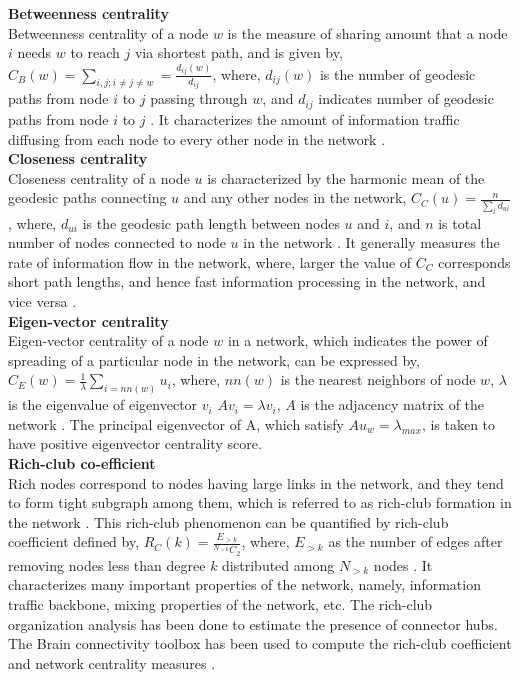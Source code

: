 \documentclass[preprintnumbers,amsmath,amssymb,onecolumn]{revtex4}
\begin{document}
{\noindent}\textbf{Betweenness centrality}\\
Betweenness centrality of a node $w$ is the measure of sharing amount that a node $i$ needs $w$ to reach $j$ via shortest path, and is given by, $C_B(w)=\sum_{i,j;i\ne j\ne w}=\frac{d_{ij}(w)}{d_{ij}}$, where, $d_{ij}(w)$ is the number of geodesic paths from node $i$ to $j$ passing through $w$, and $d_{ij}$ indicates number of geodesic paths from node $i$ to $j$ \citep{Freeman1978}. It characterizes the amount of information traffic diffusing from each node to every other node in the network \citep{borgatti2005}.\\
{\noindent}\textbf{Closeness centrality}\\
Closeness centrality of a node $u$ is characterized by the harmonic mean of the geodesic paths connecting $u$ and any other nodes in the network, $C_C(u)=\frac{n}{\sum_id_{ui}}$, where, $d_{ui}$ is the geodesic path length between nodes $u$ and $i$, and $n$ is total number of nodes connected to node $u$ in the network \citep{Canright2004}. It generally measures the rate of information flow in the network, where, larger the value of $C_C$ corresponds short path lengths, and hence fast information processing in the network, and vice versa \citep{borgatti2005}.\\
{\noindent}\textbf{Eigen-vector centrality}\\
Eigen-vector centrality of a node $w$ in a network, which indicates the power of spreading of a particular node in the network, can be expressed by, $C_E(w)=\frac{1}{\lambda}\sum_{i=nn(w)}u_i$, where, $nn(w)$ is the nearest neighbors of node $w$, $\lambda$ is the eigenvalue of eigenvector $v_i$ $Av_i=\lambda v_i$, $A$ is the adjacency matrix of the network \citep{Canright2004}. The principal eigenvector of A, which satisfy $Au_w=\lambda_{max}$, is taken to have positive eigenvector centrality score.\\
{\noindent}\textbf{Rich-club co-efficient}\\
Rich nodes correspond to nodes having large links in the network, and they tend to form tight subgraph among them, which is referred to as rich-club formation in the network \citep{zhou2004}. This rich-club phenomenon can be quantified by rich-club coefficient defined by, $R_C(k)=\frac{E_{>k}}{^{N_{>k}}C_2}$, where, $E_{>k}$ as the number of edges after removing nodes less than degree $k$ distributed among $N_{>k}$ nodes \citep{Colizza2006}. It characterizes many important properties of the network, namely, information traffic backbone, mixing properties of the network, etc. The rich-club organization analysis has been done to estimate the presence of connector hubs. The Brain connectivity toolbox has been used to compute the rich-club coefficient and network centrality measures \citep{sporns2007,Rubinov2010}.\\
\end{document}
